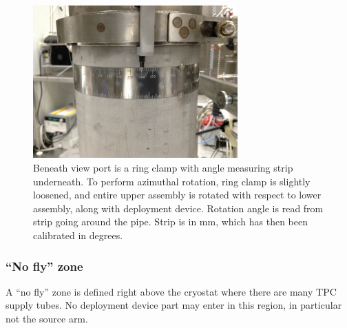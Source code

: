 

\begin{figure}[htbp]
 \centering
  \includegraphics[width=0.7\textwidth]{Figures/RingClamp_WithPin_IMG_2669.JPG}
  \caption{Beneath view port is a ring clamp with angle measuring strip underneath. To perform azimuthal rotation, ring clamp is slightly loosened, and entire upper assembly is rotated with respect to lower assembly, along with deployment device. Rotation angle is read from strip going around the pipe. Strip is in mm, which has then been calibrated in degrees.}
  \label{fig:ring_clamp}
\end{figure} 

\subsubsection{``No fly'' zone}
A ``no fly'' zone is defined right above the cryostat where there are many TPC supply tubes. No deployment device part may enter in this region, in particular not the source arm.


